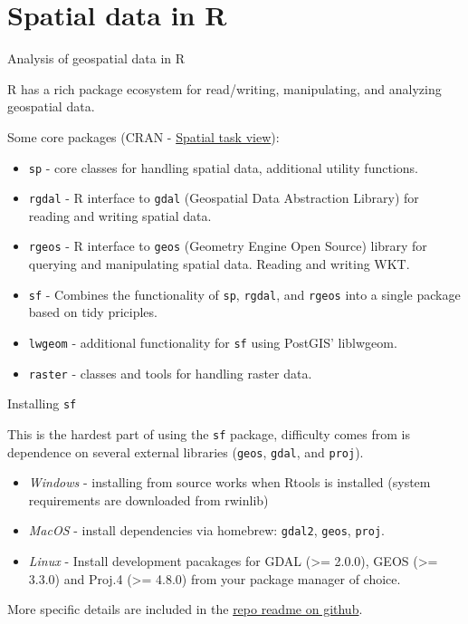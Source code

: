 \documentclass[11pt,ignorenonframetext,]{beamer}
\begin{document}
\hypertarget{spatial-data-in-r}{%
\section{Spatial data in R}\label{spatial-data-in-r}}

\begin{frame}[fragile,t]{Analysis of geospatial data in R}
\protect\hypertarget{analysis-of-geospatial-data-in-r}{}

R has a rich package ecosystem for read/writing, manipulating, and
analyzing geospatial data.

\vspace{2mm}

Some core packages (CRAN -
\href{http://cran.r-project.org/web/views/Spatial.html}{Spatial task
view}):

\begin{itemize}
\item
  \texttt{sp} - core classes for handling spatial data, additional
  utility functions.
\item
  \texttt{rgdal} - R interface to \texttt{gdal} (Geospatial Data
  Abstraction Library) for reading and writing spatial data.
\item
  \texttt{rgeos} - R interface to \texttt{geos} (Geometry Engine Open
  Source) library for querying and manipulating spatial data. Reading
  and writing WKT.
\item
  \texttt{sf} - Combines the functionality of \texttt{sp},
  \texttt{rgdal}, and \texttt{rgeos} into a single package based on tidy
  priciples.
\item
  \texttt{lwgeom} - additional functionality for \texttt{sf} using
  PostGIS' liblwgeom.
\item
  \texttt{raster} - classes and tools for handling raster data.
\end{itemize}

\end{frame}

\begin{frame}[fragile,t]{Installing \texttt{sf}}
\protect\hypertarget{installing-sf}{}

This is the hardest part of using the \texttt{sf} package, difficulty
comes from is dependence on several external libraries (\texttt{geos},
\texttt{gdal}, and \texttt{proj}).

\begin{itemize}
\item
  \emph{Windows} - installing from source works when Rtools is installed
  (system requirements are downloaded from rwinlib)
\item
  \emph{MacOS} - install dependencies via homebrew: \texttt{gdal2},
  \texttt{geos}, \texttt{proj}.
\item
  \emph{Linux} - Install development pacakages for GDAL (\textgreater{}=
  2.0.0), GEOS (\textgreater{}= 3.3.0) and Proj.4 (\textgreater{}=
  4.8.0) from your package manager of choice.
\end{itemize}

More specific details are included in the
\href{https://github.com/r-spatial/sf}{repo readme on github}.

\end{frame}
\end{document}
